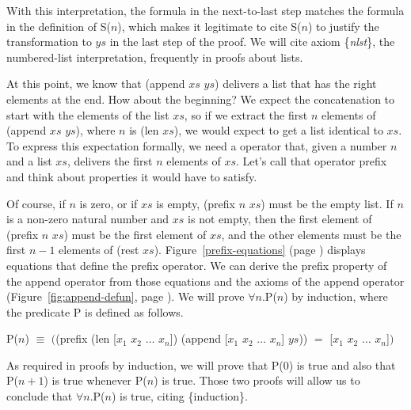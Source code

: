 With this interpretation, the formula in the next-to-last step
matches the formula in the definition of S($n$),
which makes it legitimate to cite S($n$) to justify
the transformation to $ys$ in the last step of the proof.
We will cite axiom \{\emph{nlst}\}, the numbered-list interpretation,
frequently in proofs about lists.

At this point, we know that (append $xs$ $ys$) delivers
a list that has the right elements at the end.
How about the beginning?
We expect the concatenation to start with the elements of the list $xs$,
so if we extract the first $n$ elements of (append $xs$ $ys$), where $n$ is (len $xs$),
we would expect to get a list identical to $xs$.
To express this expectation formally, we need a operator that,
given a number $n$ and a list $xs$, delivers the first $n$ elements of $xs$.
Let's call that operator \textsf{prefix} and think about properties it would have to satisfy.

Of course, if $n$ is zero, or if $xs$ is empty,
\textsf{(prefix $n$ $xs$)} must be the empty list.
If $n$ is a non-zero natural number and $xs$ is not empty,
then the first element of \textsf{(prefix $n$ $xs$)} must be the first element of $xs$,
and the other elements must be the first $n-1$ elements of (rest $xs$).
Figure~\ref{prefix-equations} (page \pageref{prefix-equations}) displays
equations that define the \textsf{prefix} operator.
We can derive the prefix property of the \textsf{append} operator
from those equations and the axioms of the \textsf{append} operator
(Figure~\ref{fig:append-defun}, page \pageref{fig:append-defun}).
We will prove $\forall n.$P($n$) by induction,
where the predicate P is defined as follows.
\begin{center}
P($n$) $\equiv$ $($\textsf{(prefix (len [$x_1$ $x_2$ $\dots$ $x_n$]) (append [$x_1$ $x_2$ $\dots$ $x_n$] $ys$))}
                $=$ \textsf{[$x_1$ $x_2$ $\dots$ $x_n$]}$)$
\end{center}

As required in proofs by induction, we will prove that P(0) is true
and also that P($n+1$) is true whenever P($n$) is true.
Those two proofs will allow us to conclude that
$\forall n.$P($n$) is true, citing \{induction\}.

